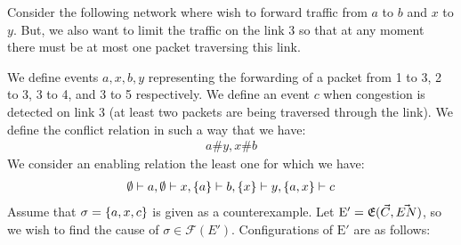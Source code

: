 \begin{example}
    Consider the following network where wish to forward traffic from $a$ to $b$ and $x$ to $y$.
    But, we also want to limit the traffic on the link 3 so that at any moment
    there must be at most one packet traversing this link.
    \begin{center}
    \end{center}
    We define events $a,x,b,y$ representing the forwarding of a packet from
    1 to 3, 2 to 3, 3 to 4, and 3 to 5 respectively.
    We define an event $c$ when congestion is detected on link 3 (at least two packets are being traversed through the link).
    We define the conflict relation in such a way that we have:
    \begin{align*}
        a \# y, x\# b
    \end{align*}
    We consider an enabling relation the least one for which we have:
    \begin{align*}
        \emptyset \vdash a, \emptyset \vdash x, \{a\} \vdash b, \{x\} \vdash y,
        \{a,x\} \vdash c
    \end{align*}
    Assume that $\sigma = \{a,x,c\}$ is given as a counterexample.
    Let $\mathrm{E'} = \mathfrak{E}(\vec C,\vec {EN})$, so we wish to find the cause of
    $ \sigma \in \mathcal{F}(E')$.
    Configurations of $\mathrm{E'}$ are as follows:
    \begin{center}
\end{center}
\end{example}
